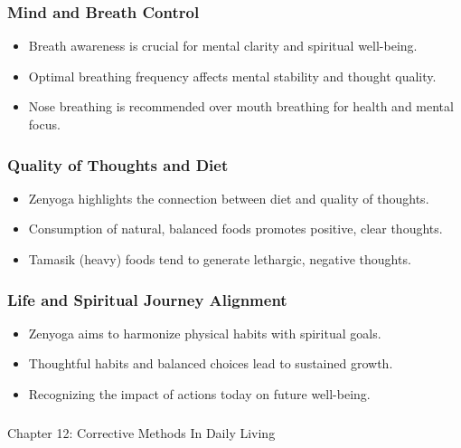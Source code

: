 \begin{frame}[fragile]\frametitle{Mind and Breath Control}
    \begin{itemize}
        \item Breath awareness is crucial for mental clarity and spiritual well-being.
        \item Optimal breathing frequency affects mental stability and thought quality.
        \item Nose breathing is recommended over mouth breathing for health and mental focus.
    \end{itemize}
\end{frame}

\begin{frame}[fragile]\frametitle{Quality of Thoughts and Diet}
    \begin{itemize}
        \item Zenyoga highlights the connection between diet and quality of thoughts.
        \item Consumption of natural, balanced foods promotes positive, clear thoughts.
        \item Tamasik (heavy) foods tend to generate lethargic, negative thoughts.
    \end{itemize}
\end{frame}

\begin{frame}[fragile]\frametitle{Life and Spiritual Journey Alignment}
    \begin{itemize}
        \item Zenyoga aims to harmonize physical habits with spiritual goals.
        \item Thoughtful habits and balanced choices lead to sustained growth.
        \item Recognizing the impact of actions today on future well-being.
    \end{itemize}
\end{frame}


\begin{frame}[fragile]\frametitle{}
\begin{center}
{\Large Chapter 12: Corrective Methods In Daily Living }
\end{center}
\end{frame}

